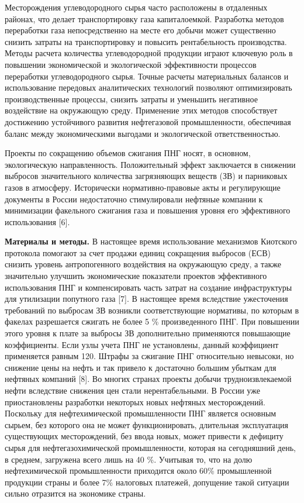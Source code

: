 Месторождения углеводородного сырья часто расположены в отдаленных
районах, что делает транспортировку газа капиталоемкой. Разработка
методов переработки газа непосредственно на месте его добычи может
существенно снизить затраты на транспортировку и повысить рентабельность
производства. Методы расчета количества углеводородной продукции играют
ключевую роль в повышении экономической и экологической эффективности
процессов переработки углеводородного сырья. Точные расчеты материальных
балансов и использование передовых аналитических технологий позволяют
оптимизировать производственные процессы, снизить затраты и уменьшить
негативное воздействие на окружающую среду. Применение этих методов
способствует достижению устойчивого развития нефтегазовой
промышленности, обеспечивая баланс между экономическими выгодами и
экологической ответственностью.

Проекты по сокращению объемов сжигания ПНГ носят, в основном,
экологическую направленность. Положительный эффект заключается в
снижении выбросов значительного количества загрязняющих веществ (ЗВ) и
парниковых газов в атмосферу. Исторически нормативно-правовые акты и
регулирующие документы в России недостаточно стимулировали нефтяные
компании к минимизации факельного сжигания газа и повышения уровня его
эффективного использования {[}6{]}.

{\bfseries Материалы и методы.} В настоящее время использование механизмов
Киотского протокола помогают за счет продажи единиц сокращения выбросов
(ЕСВ) снизить уровень антропогенного воздействия на окружающую среду, а
также значительно улучшить экономические показатели проектов
эффективного использования ПНГ и компенсировать часть затрат на создание
инфраструктуры для утилизации попутного газа {[}7{]}. В настоящее время
вследствие ужесточения требований по выбросам ЗВ возникли
соответствующие нормативы, по которым в факелах разрешается сжигать не
более 5 \% произведенного ПНГ. При повышении этого уровня к плате за
выбросы ЗВ дополнительно применяются повышающие коэффициенты. Если узлы
учета ПНГ не установлены, данный коэффициент применяется равным 120.
Штрафы за сжигание ПНГ относительно невысоки, но снижение цены на нефть
и так привело к достаточно большим убыткам для нефтяных компаний
{[}8{]}. Во многих странах проекты добычи трудноизвлекаемой нефти
вследствие снижения цен стали нерентабельными. В России уже
приостановлены разработки некоторых новых нефтяных месторождений.
Поскольку для нефтехимической промышленности ПНГ является основным
сырьем, без которого она не может функционировать, длительная
эксплуатация существующих месторождений, без ввода новых, может привести
к дефициту сырья для нефтегазохимической промышленности, которая на
сегодняшний день, в среднем, загружена всего лишь на 40 \%. Учитывая то,
что на долю нефтехимической промышленности приходится около 60\%
промышленной продукции страны и более 7\% налоговых платежей, допущение
такой ситуации сильно отразится на экономике страны.

